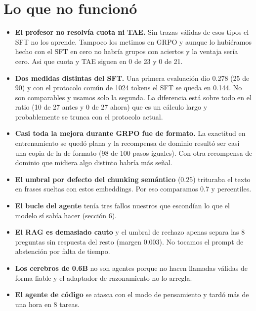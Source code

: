 \documentclass[10pt,a4paper]{article}
\begin{document}
\section{Lo que no funcionó}
\begin{itemize}
\item \textbf{El profesor no resolvía cuota ni TAE.} Sin trazas válidas de esos tipos el SFT no los aprende. Tampoco los metimos en GRPO y aunque lo hubiéramos hecho con el SFT en cero no habría grupos con aciertos y la ventaja sería cero. Asi que cuota y TAE siguen en 0 de 23 y 0 de 21.
\item \textbf{Dos medidas distintas del SFT.} Una primera evaluación dio 0.278 (25 de 90) y con el protocolo común de 1024 tokens el SFT se queda en 0.144. No son comparables y usamos solo la segunda. La diferencia está sobre todo en el ratio (10 de 27 antes y 0 de 27 ahora) que es un cálculo largo y probablemente se trunca con el protocolo actual.
\item \textbf{Casi toda la mejora durante GRPO fue de formato.} La exactitud en entrenamiento se quedó plana y la recompensa de dominio resultó ser casi una copia de la de formato (98 de 100 pasos iguales). Con otra recompensa de dominio que midiera algo distinto habría más señal.
\item \textbf{El umbral por defecto del chunking semántico} (0.25) trituraba el texto en frases sueltas con estos embeddings. Por eso comparamos 0.7 y percentiles.
\item \textbf{El bucle del agente} tenía tres fallos nuestros que escondían lo que el modelo sí sabía hacer (sección 6).
\item \textbf{El RAG es demasiado cauto} y el umbral de rechazo apenas separa las 8 preguntas sin respuesta del resto (margen 0.003). No tocamos el prompt de abstención por falta de tiempo.
\item \textbf{Los cerebros de 0.6B} no son agentes porque no hacen llamadas válidas de forma fiable y el adaptador de razonamiento no lo arregla.
\item \textbf{El agente de código} se atasca con el modo de pensamiento y tardó más de una hora en 8 tareas.
\end{itemize}
\end{document}
